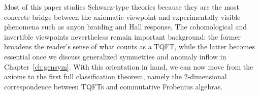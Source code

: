 \medskip

\noindent Most of this paper studies Schwarz-type theories because they are the most concrete bridge between the axiomatic viewpoint and experimentally visible phenomena such as anyon braiding and Hall response. The cohomological and invertible viewpoints nevertheless remain important background: the former broadens the reader's sense of what counts as a TQFT, while the latter becomes essential once we discuss generalized symmetries and anomaly inflow in Chapter~\ref{ch:gensym}. With this orientation in hand, we can now move from the axioms to the first full classification theorem, namely the 2-dimensional correspondence between TQFTs and commutative Frobenius algebras.
